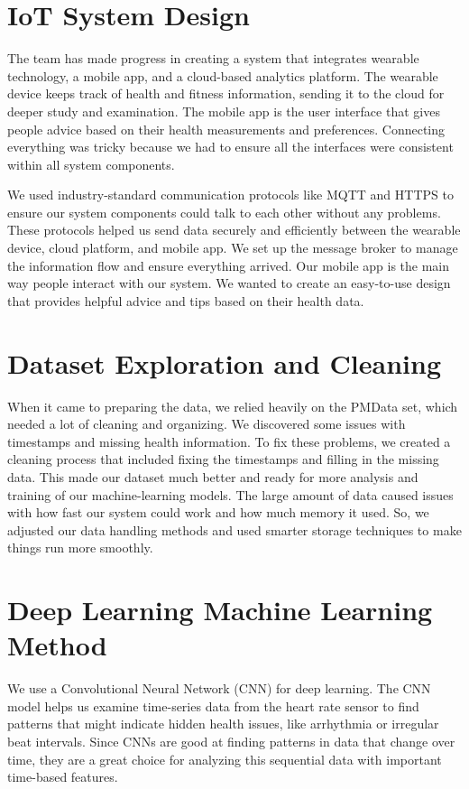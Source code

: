 \documentclass[10pt]{extarticle}
\begin{document}
\section{IoT System Design}

The team has made progress in creating a system that integrates wearable technology, a mobile app, and a cloud-based analytics platform. The wearable device keeps track of health and fitness information, sending it to the cloud for deeper study and examination. The mobile app is the user interface that gives people advice based on their health measurements and preferences. Connecting everything was tricky because we had to ensure all the interfaces were consistent within all system components.

We used industry-standard communication protocols like MQTT and HTTPS to ensure our system components could talk to each other without any problems. These protocols helped us send data securely and efficiently between the wearable device, cloud platform, and mobile app. We set up the message broker to manage the information flow and ensure everything arrived. Our mobile app is the main way people interact with our system. We wanted to create an easy-to-use design that provides helpful advice and tips based on their health data.

\section{Dataset Exploration and Cleaning}

When it came to preparing the data, we relied heavily on the PMData set, which needed a lot of cleaning and organizing. We discovered some issues with timestamps and missing health information. To fix these problems, we created a cleaning process that included fixing the timestamps and filling in the missing data. This made our dataset much better and ready for more analysis and training of our machine-learning models. The large amount of data caused issues with how fast our system could work and how much memory it used. So, we adjusted our data handling methods and used smarter storage techniques to make things run more smoothly.

\section{Deep Learning Machine Learning Method}

We use a Convolutional Neural Network (CNN) for deep learning. The CNN model helps us examine time-series data from the heart rate sensor to find patterns that might indicate hidden health issues, like arrhythmia or irregular beat intervals. Since CNNs are good at finding patterns in data that change over time, they are a great choice for analyzing this sequential data with important time-based features.
\end{document}
